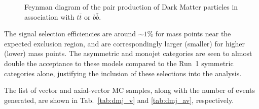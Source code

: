\begin{figure}[h!] \centering
  \caption{Feynman diagram of the pair production of Dark Matter particles in
  association with $t\bar{t}$ or $b\bar{b}$. \cite{Abercrombie:2015wmb}}
  \label{fig:feynman_hf}
\end{figure}

The signal selection efficiencies are around $\sim 1$\% for mass points near the expected exclusion
region, and are correspondingly larger (smaller) for higher (lower) mass points.
The asymmetric and monojet categories are seen to almost double the acceptance
to these models compared to the Run~1 symmetric categories alone, justifying the
inclusion of these selections into the analysis.

The list of vector and axial-vector MC samples, along with the number of events 
generated, are shown in Tab.~\ref{tab:dmj_v} and \ref{tab:dmj_av}, respectively.

